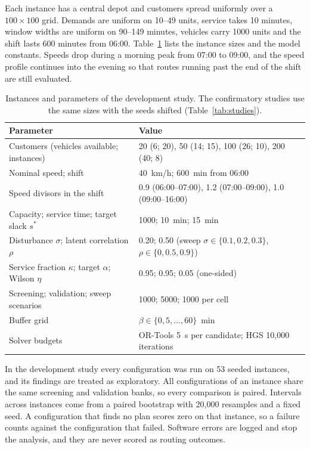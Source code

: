 \documentclass{itor}
\begin{document}
Each instance has a central depot and customers spread uniformly over a
$100\times100$ grid. Demands are uniform on 10--49 units, service takes 10
minutes, window widths are uniform on 90--149 minutes, vehicles carry 1000 units
and the shift lasts 600 minutes from 06:00. Table~\ref{tab:parameters} lists the
instance sizes and the model constants. Speeds drop during a morning peak from
07:00 to 09:00, and the speed profile continues into the evening so that routes
running past the end of the shift are still evaluated.

\begin{table}[t]
\centering
\footnotesize
\caption{Instances and parameters of the development study. The confirmatory
studies use the same sizes with the seeds shifted (Table~\ref{tab:studies}).}
\label{tab:parameters}
\begin{tabular}{@{}p{}p{}@{}}
\toprule
Parameter & Value\\
\midrule
Customers (vehicles available; instances) & 20 (6; 20), 50 (14; 15), 100 (26; 10), 200 (40; 8)\\
Nominal speed; shift & 40~km/h; 600~min from 06:00\\
Speed divisors in the shift & 0.9 (06:00--07:00), 1.2 (07:00--09:00), 1.0 (09:00--16:00)\\
Capacity; service time; target slack $s^*$ & 1000; 10~min; 15~min\\
Disturbance $\sigma$; latent correlation $\rho$ & 0.20; 0.50 (sweep $\sigma\in\{0.1,0.2,0.3\}$, $\rho\in\{0,0.5,0.9\}$)\\
Service fraction $\kappa$; target $\alpha$; Wilson $\eta$ & 0.95; 0.95; 0.05 (one-sided)\\
Screening; validation; sweep scenarios & 1000; 5000; 1000 per cell\\
Buffer grid & $\beta\in\{0,5,\ldots,60\}$~min\\
Solver budgets & OR-Tools 5~s per candidate; HGS 10,000 iterations\\
\bottomrule
\end{tabular}
\end{table}

In the development study every configuration was run on 53 seeded instances,
and its findings are treated as exploratory. All configurations of an instance
share the same screening and validation banks, so every comparison is paired.
Intervals across instances come from a paired bootstrap with 20,000 resamples
and a fixed seed. A configuration that finds no plan scores zero on that
instance, so a failure counts against the configuration that failed. Software
errors are logged and stop the analysis, and they are never scored as routing
outcomes.
\end{document}
